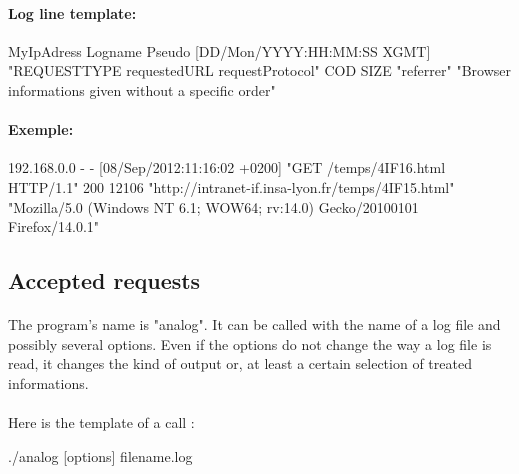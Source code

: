 \documentclass[a4paper, 12pts]{article}
\begin{document}
\paragraph{Log line template:}
MyIpAdress Logname Pseudo [DD/Mon/YYYY:HH:MM:SS XGMT] "REQUESTTYPE requestedURL requestProtocol" COD SIZE "referrer" "Browser informations given without a specific order"

\paragraph{Exemple:}
 192.168.0.0 - - [08/Sep/2012:11:16:02 +0200] "GET /temps/4IF16.html HTTP/1.1" 200 12106 "http://intranet-if.insa-lyon.fr/temps/4IF15.html" "Mozilla/5.0 (Windows NT 6.1; WOW64; rv:14.0) Gecko/20100101 Firefox/14.0.1"
 
\subsection{Accepted requests}
\paragraph{}
 The program's name is "analog". It can be called with the name of a log file and possibly several options. Even if the options do not change the way a log file is read, it changes the kind of output or, at least a certain selection of treated informations.
\paragraph{} 
Here is the template of a call :
 
./analog [options] filename.log
\end{document}
